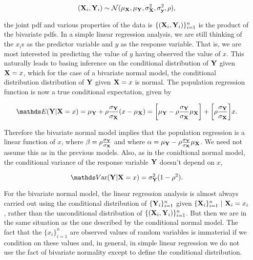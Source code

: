 \documentclass{homework}
\begin{document}
$$
({\bf X}_i, {\bf Y}_i) \sim \mathcal{N}(\mu_{\bf X}, \mu_{\bf Y}, \sigma^2_{\bf X}, \sigma^2_{\bf y}, \rho),
$$

the joint pdf and various properties of the data is $\{({\bf X}_i, {\bf Y}_i)\}_{i=1}^n$ is the product of the bivariate pdfs. In a simple linear regression analysis, we are still thinking of the $x_i$s as the predictor variable and $y$ as the response variable. That is, we are most interested in predicting the value of $y$ having observed the value of $x$. This naturally leads to basing inference on the conditional distribution of ${\bf Y}$ given ${\bf X} = x$, which for the case of a bivariate normal model, the conditional distribution distribution of ${\bf Y}$ given ${\bf X} = x$ is normal. The population regression function is now a true conditional expectation, given by

$$
\E(\Y|\X = x) = \mu_{\Y} + \rho \frac{\sigma_{\Y}}{\sigma_\X} (x-\mu_\X) = \bigg[\mu_\Y - \rho \frac{\sigma_{\Y}}{\sigma_\X} \mu_\X \bigg] + \bigg[ \rho \frac{\sigma_{\Y}}{\sigma_\X}\bigg]x.
$$

Therefore the bivariate normal model implies that the population regression is a linear function of $x$, where $\beta = \rho \frac{\sigma_{{\bf Y}}}{\sigma_{\bf X}}$ and where $\alpha = \mu_{\bf Y} - \rho \frac{\sigma_{{\bf Y}}}{\sigma_{\bf X}} \mu_{\bf X}$. We need not assume this as in the previous models. Also, as in the conidtional normal model, the conditional variance of the response variable ${\bf Y}$ doesn't depend on $x$,

$$
\var(\Y|\X = x) = \sigma^2_\Y (1-\rho^2).
$$

For the bivariate normal model, the linear regression analysis is almost always carried out using the conditional distribution of $\{{\bf Y}_i\}_{i=1}^n$ 
given $\{{\bf X}_i\}_{i=1}^n \textnormal{ } |\textnormal{ } {\bf X}_i = x_i $, rather than the unconditional distribution of $\{({\bf X}_i, {\bf Y}_i)\}_{i=1}^n$. But then we are in the same situation as the one described by the conditional normal model. The fact that the $\{x_i\}_{i=1}^{n}$ are observed values of random variables is immaterial if we condition on these values and, in general, in simple linear regression we do not use the fact of bivariate normality except to define the conditional distribution. 
\end{document}
